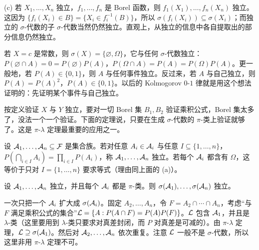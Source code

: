 (c) 若 $X_1,\dots,X_n$ 独立，$f_1,\dots,f_n$ 是 Borel 函数，则 $f_1(X_1),\dots,f_n(X_n)$ 独立。这因为 $\{f_i(X_i)\in B\}=\{X_i\in f_i^{-1}(B)\}$，所以 $\sigma(f_i(X_i))\subseteq\sigma(X_i)$；而独立的 $\sigma$-代数的子 $\sigma$-代数当然仍然独立。直观上，从独立的信息中各自提取出的部分信息仍然独立。

\begin{example}[常数与一切独立]\label{ex:independence:constant}
若 $X=c$ 是常数，则 $\sigma(X)=\{\varnothing,\Omega\}$，它与任何 $\sigma$-代数独立：$P(\varnothing\cap A)=0=P(\varnothing)P(A)$，$P(\Omega\cap A)=P(A)=P(\Omega)P(A)$。更一般地，若 $P(A)\in\{0,1\}$，则 $A$ 与任何事件独立。反过来，若 $A$ 与自己独立，则 $P(A)=P(A)^2$，$P(A)\in\{0,1\}$。以后的 Kolmogorov $0$-$1$ 律就是用这个想法证明的：先证明某个事件与自己独立。
\end{example}


按定义验证 $X$ 与 $Y$ 独立，要对一切 Borel 集 $B_1,B_2$ 验证乘积公式，Borel 集太多了，没法一个一个验证。下面的定理说，只要在生成 $\sigma$-代数的 $\pi$-类上验证就够了。这是 $\pi$-$\lambda$ 定理最重要的应用之一。

\begin{definition}\label{def:independence:collections}
设 $\mathcal{A}_1,\dots,\mathcal{A}_n\subseteq\mathcal{F}$ 是集合族。若对任意 $A_i\in\mathcal{A}_i$ 与任意 $I\subseteq\{1,\dots,n\}$，$P(\bigcap_{i\in I}A_i)=\prod_{i\in I}P(A_i)$，称 $\mathcal{A}_1,\dots,\mathcal{A}_n$ 独立。若每个 $\mathcal{A}_i$ 都含有 $\Omega$，这等价于只对 $I=\{1,\dots,n\}$ 要求等式（理由同上面的 (a)）。
\end{definition}

\begin{theorem}[用 $\pi$-类判别独立性]\label{thm:independence:pi-systems}
设 $\mathcal{A}_1,\dots,\mathcal{A}_n$ 独立，并且每个 $\mathcal{A}_i$ 都是 $\pi$-类。则 $\sigma(\mathcal{A}_1),\dots,\sigma(\mathcal{A}_n)$ 独立。
\end{theorem}

\begin{remark}[证明思路]
一次只把一个 $\mathcal{A}_i$ 扩大成 $\sigma(\mathcal{A}_i)$。固定 $A_2,\dots,A_n$，令 $F=A_2\cap\cdots\cap A_n$，考虑“与 $F$ 满足乘积公式的集合”$\mathcal{L}=\{A:P(A\cap F)=P(A)P(F)\}$。$\mathcal{L}$ 包含 $\mathcal{A}_1$，并且是 $\lambda$-类（这里要用到 $\lambda$-类只要求对真差封闭，而 $P$ 对真差是可减的）。由 $\pi$-$\lambda$ 定理，$\mathcal{L}\supseteq\sigma(\mathcal{A}_1)$。然后对 $\mathcal{A}_2,\dots,\mathcal{A}_n$ 依次重复。注意 $\mathcal{L}$ 一般不是 $\sigma$-代数，所以这里非用 $\pi$-$\lambda$ 定理不可。
\end{remark}

